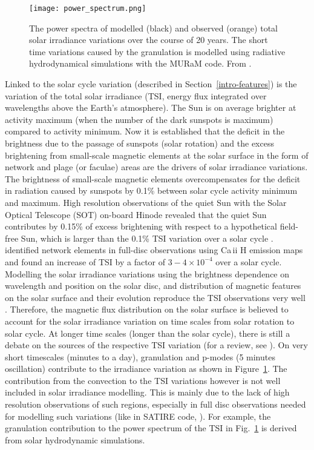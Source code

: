 \documentclass[goettingen, gauss, print]{thesis}
\begin{document}
\begin{figure}
\centering
\hspace*{-1cm}\texttt{[image: power\_spectrum.png]}
\caption{The power spectra of modelled (black) and observed (orange) total solar irradiance variations over the course of 20 years. The short time variations caused by the granulation is modelled using radiative hydrodynamical simulations with the MURaM code. From \cite{shapiro_nature_2017}.}
\label{power_spectrum}
\end{figure}

Linked to the solar cycle variation (described in Section~\ref{intro-features}) is the variation of the total solar irradiance (TSI, energy flux integrated over wavelengths above the Earth's atmosphere). The Sun is on average brighter at activity maximum (when the number of the dark sunspots is maximum) compared to activity minimum. Now it is established that the deficit in the brightness due to the passage of sunspots (solar rotation) and the excess brightening from small-scale magnetic elements at the solar surface in the form of network and plage (or faculae) areas are the drivers of solar irradiance variations.
The brightness of small-scale magnetic elements overcompensates for the deficit in radiation caused by sunspots by 0.1\% between solar cycle activity minimum and maximum. High resolution observations of the quiet Sun with the Solar Optical Telescope (SOT) on-board Hinode revealed that the quiet Sun contributes by 0.15\% of excess brightening with respect to a hypothetical field-free Sun, which is larger than the 0.1\% TSI variation over a solar cycle \citep{schnerr_brightness_2011}. \cite{ermolli_measure_2003} identified network elements in full-disc observations using Ca\,{\sc ii} H emission maps and found an increase of TSI by a factor of $3-4\times 10^{-4}$ over a solar cycle.
Modelling the solar irradiance variations using the brightness dependence on wavelength and position on the solar disc, and distribution of magnetic features on the solar surface and their evolution reproduce the TSI observations very well \citep{krivova_reconstruction_2003, shapiro_nature_2017}.
Therefore, the magnetic flux distribution on the solar surface is believed to account for the solar irradiance variation on time scales from solar rotation to solar cycle.
At longer time scales (longer than the solar cycle), there is still a debate on the sources of the respective TSI variation (for a review, see \cite{solanki_solar_2013}). 
On very short timescales (minutes to a day), granulation and p-modes (5 minutes oscillation) contribute to the irradiance variation as shown in Figure~\ref{power_spectrum}.
The contribution from the convection to the TSI variations however is not well included  in solar irradiance modelling. This is mainly due to the lack of high resolution observations of such regions, especially in full disc observations needed for modelling such variations (like in SATIRE code, \cite{krivova_reconstruction_2003}). For example, the granulation contribution to the power spectrum of the TSI in Fig.~\ref{power_spectrum} is derived from solar hydrodynamic simulations.
\end{document}
